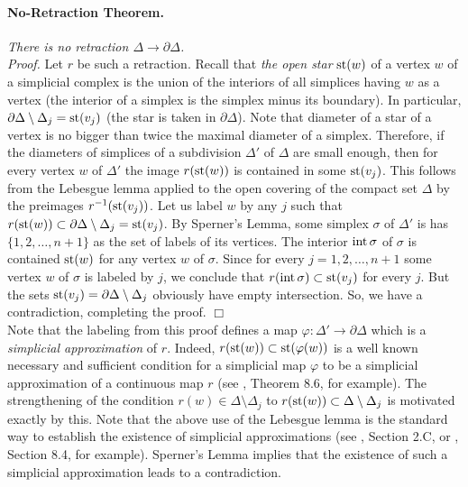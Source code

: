 \documentclass[leqno, 11pt]{article}\usepackage{latexsym}\usepackage{amsmath, amscd}\usepackage{amssymb}
\begin{document}
\paragraph{No-Retraction Theorem.} {\em There is no retraction $\Delta\rightarrow\partial\Delta$.}\\

\noindent
{\em Proof.} Let $r$ be such a retraction. Recall that {\em the open star\/} ${\rm st}(w)$ of a vertex $w$ of a simplicial complex is the union of the interiors of all simplices having $w$ as a vertex (the interior of a simplex is the simplex minus its boundary). 
In particular, $\partial\Delta\setminus\Delta_j={\rm st}(v_j)$ (the star is taken in $\partial\Delta$). 
Note that diameter of a star of a vertex is no bigger than twice the maximal diameter of a simplex. 
Therefore, if the diameters of simplices of a subdivision $\Delta'$ of $\Delta$ are small enough, 
then for every vertex $w$ of $\Delta'$ the image $r({\rm st}(w))$ is contained in some ${\rm st}(v_j)$. 
This follows from the Lebesgue lemma applied to the open covering of the compact set $\Delta$ by the preimages $r^{-1}({\rm st} (v_j))$. 
Let us label $w$ by any $j$ such that  $r({\rm st}(w))\subset\partial\Delta\setminus\Delta_j={\rm st}(v_j)$. 
By Sperner's Lemma, some simplex $\sigma$ of $\Delta'$ is has $\{1,2,\ldots, n+1\}$ as the set of labels of its vertices. 
The interior ${\rm int}\,\sigma$ of $\sigma$ is contained ${\rm st}(w)$ for any vertex $w$ of $\sigma$. 
Since for every $j=1,2,\ldots,n+1$ some vertex $w$ of $\sigma$ is labeled by $j$, we conclude that 
$r({\rm int}\,\sigma)\subset{\rm st}(v_j)$ for every $j$. 
But the sets ${\rm st}(v_j)=\partial\Delta\setminus\Delta_j$ obviously have empty intersection. 
So, we have a contradiction, completing the proof. $\Box$\\

Note that the labeling from this proof defines a map $\varphi:\Delta'\rightarrow\partial\Delta$ which is a {\em simplicial approximation} of $r$. Indeed,
$r({\rm st}(w))\subset{\rm st}(\varphi(w))$ is a well known necessary and sufficient condition for a simplicial map $\varphi$ to be a simplicial approximation of a continuous map $r$ (see \cite{P1}, Theorem 8.6, for example). The strengthening of the condition $r(w)\in\Delta\setminus\Delta_j$ to $r({\rm st}(w))\subset \Delta\setminus\Delta_j$ is motivated exactly by this. Note that the above use of the Lebesgue lemma is the standard way to establish the existence of simplicial approximations (see \cite{H}, Section 2.C, or \cite{P1}, Section 8.4, for example). Sperner's Lemma implies that the existence of such a simplicial approximation leads to a contradiction.
\end{document}
